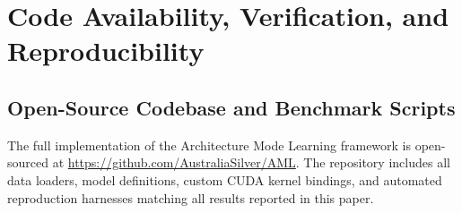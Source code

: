 \documentclass[11pt, a4paper]{article}
\begin{document}
\begin{table}[h!]
\centering
\caption{\textbf{Structural Specification of the 18-Layer Hybrid Supernet.} Input resolution $32 \times 32$, base channel width $D_{\max} = 48$, attention heads $H = 4$.}
\label{tab:layer_specs}
\footnotesize
\renewcommand{\arraystretch}{0.9}
\end{table}

\section{Code Availability, Verification, and Reproducibility}
\label{sec:appendix_code}

\subsection{Open-Source Codebase and Benchmark Scripts}
The full implementation of the Architecture Mode Learning framework is open-sourced at \url{https://github.com/AustraliaSilver/AML}. The repository includes all data loaders, model definitions, custom CUDA kernel bindings, and automated reproduction harnesses matching all results reported in this paper.
\end{document}
